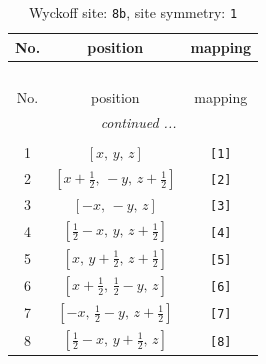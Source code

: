 \documentclass[fleqn,8pt]{jsarticle}
\begin{document}
\begin{longtable}{ccc}
\caption{Wyckoff site: {\tt 8b}, site symmetry: {\tt 1}}
 \\
 \hline \hline
No. & position & mapping \\ \hline \endfirsthead

\multicolumn{2}{l}{\tablename\ \thetable{}} \\
 \hline \hline
No. & position & mapping \\ \hline \endhead

 \hline \hline
\multicolumn{2}{r}{\footnotesize\it continued ...} \\ \endfoot

 \hline \hline
\multicolumn{2}{r}{} \\ \endlastfoot

1 & $\left[ x,\, y,\, z \right]$ & {\tt [1]} \\ \hline
2 & $\left[ x + \frac{1}{2},\, - y,\, z + \frac{1}{2} \right]$ & {\tt [2]} \\ \hline
3 & $\left[ - x,\, - y,\, z \right]$ & {\tt [3]} \\ \hline
4 & $\left[ \frac{1}{2} - x,\, y,\, z + \frac{1}{2} \right]$ & {\tt [4]} \\ \hline
5 & $\left[ x,\, y + \frac{1}{2},\, z + \frac{1}{2} \right]$ & {\tt [5]} \\ \hline
6 & $\left[ x + \frac{1}{2},\, \frac{1}{2} - y,\, z \right]$ & {\tt [6]} \\ \hline
7 & $\left[ - x,\, \frac{1}{2} - y,\, z + \frac{1}{2} \right]$ & {\tt [7]} \\ \hline
8 & $\left[ \frac{1}{2} - x,\, y + \frac{1}{2},\, z \right]$ & {\tt [8]} \\
\end{longtable}
\end{document}
